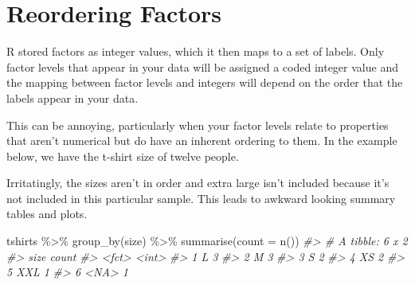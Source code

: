\documentclass[
  12pt,
]{book}
\newenvironment{Shaded}{\begin{snugshade}}{\end{snugshade}}
\newcommand{\AttributeTok}[1]{\textcolor[rgb]{0.77,0.63,0.00}{#1}}
\newcommand{\CommentTok}[1]{\textcolor[rgb]{0.56,0.35,0.01}{\textit{#1}}}
\newcommand{\ConstantTok}[1]{\textcolor[rgb]{0.00,0.00,0.00}{#1}}
\newcommand{\DecValTok}[1]{\textcolor[rgb]{0.00,0.00,0.81}{#1}}
\newcommand{\FunctionTok}[1]{\textcolor[rgb]{0.00,0.00,0.00}{#1}}
\newcommand{\NormalTok}[1]{#1}
\newcommand{\OtherTok}[1]{\textcolor[rgb]{0.56,0.35,0.01}{#1}}
\newcommand{\SpecialCharTok}[1]{\textcolor[rgb]{0.00,0.00,0.00}{#1}}
\newcommand{\StringTok}[1]{\textcolor[rgb]{0.31,0.60,0.02}{#1}}
\begin{document}
\hypertarget{reordering-factors}{%
\section{Reordering Factors}\label{reordering-factors}}

R stored factors as integer values, which it then maps to a set of labels. Only factor levels that appear in your data will be assigned a coded integer value and the mapping between factor levels and integers will depend on the order that the labels appear in your data.

This can be annoying, particularly when your factor levels relate to properties that aren't numerical but do have an inherent ordering to them. In the example below, we have the t-shirt size of twelve people.

\begin{Shaded}
\end{Shaded}

Irritatingly, the sizes aren't in order and extra large isn't included because it's not included in this particular sample. This leads to awkward looking summary tables and plots.

\begin{Shaded}
\begin{Highlighting}[]
\NormalTok{tshirts }\SpecialCharTok{\%\textgreater{}\%} \FunctionTok{group\_by}\NormalTok{(size) }\SpecialCharTok{\%\textgreater{}\%} \FunctionTok{summarise}\NormalTok{(}\AttributeTok{count =} \FunctionTok{n}\NormalTok{())}
\CommentTok{\#\textgreater{} \# A tibble: 6 x 2}
\CommentTok{\#\textgreater{}   size  count}
\CommentTok{\#\textgreater{}   \textless{}fct\textgreater{} \textless{}int\textgreater{}}
\CommentTok{\#\textgreater{} 1 L         3}
\CommentTok{\#\textgreater{} 2 M         3}
\CommentTok{\#\textgreater{} 3 S         2}
\CommentTok{\#\textgreater{} 4 XS        2}
\CommentTok{\#\textgreater{} 5 XXL       1}
\CommentTok{\#\textgreater{} 6 \textless{}NA\textgreater{}      1}
\end{Highlighting}
\end{Shaded}
\end{document}
